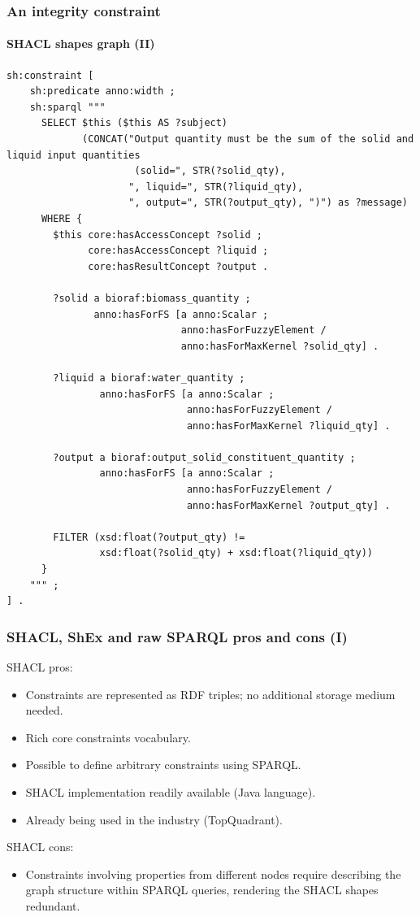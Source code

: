 \documentclass{beamer}
\begin{document}
\begin{frame}[fragile]
  \frametitle{An integrity constraint}
  \framesubtitle{SHACL shapes graph (II)}

  \begin{Verbatim}[fontsize=\tiny]
  sh:constraint [
    sh:predicate anno:width ;
    sh:sparql """
      SELECT $this ($this AS ?subject)
             (CONCAT("Output quantity must be the sum of the solid and liquid input quantities
                      (solid=", STR(?solid_qty),
                     ", liquid=", STR(?liquid_qty),
                     ", output=", STR(?output_qty), ")") as ?message)
      WHERE {
        $this core:hasAccessConcept ?solid ;
              core:hasAccessConcept ?liquid ;
              core:hasResultConcept ?output .

        ?solid a bioraf:biomass_quantity ;
               anno:hasForFS [a anno:Scalar ;
                              anno:hasForFuzzyElement /
                              anno:hasForMaxKernel ?solid_qty] .

        ?liquid a bioraf:water_quantity ;
                anno:hasForFS [a anno:Scalar ;
                               anno:hasForFuzzyElement /
                               anno:hasForMaxKernel ?liquid_qty] .

        ?output a bioraf:output_solid_constituent_quantity ;
                anno:hasForFS [a anno:Scalar ;
                               anno:hasForFuzzyElement /
                               anno:hasForMaxKernel ?output_qty] .

        FILTER (xsd:float(?output_qty) !=
                xsd:float(?solid_qty) + xsd:float(?liquid_qty))
      }
    """ ;
] .

  \end{Verbatim}
\end{frame}

\begin{frame}
  \frametitle{SHACL, ShEx and raw SPARQL pros and cons (I)}

  SHACL pros:

  \begin{itemize}
    \item Constraints are represented as RDF triples; no additional storage
      medium needed.
    \item Rich core constraints vocabulary.
    \item Possible to define arbitrary constraints using SPARQL.
    \item SHACL implementation readily available (Java language).
    \item Already being used in the industry (TopQuadrant).
  \end{itemize}

  SHACL cons:

  \begin{itemize}
    \item Constraints involving properties from different nodes require
      describing the graph structure within SPARQL queries, rendering the
      SHACL shapes redundant.
  \end{itemize}
\end{frame}
\end{document}
